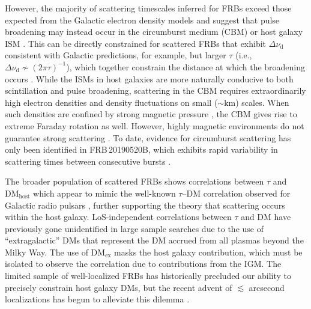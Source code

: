 \documentclass[twocolumn, linenumbers, tra]{aastex631}
\begin{document}
However, the majority of scattering timescales inferred for FRBs exceed those expected from the Galactic electron density models \citep[e.g., NE2001;][]{Cordes2002} and suggest that pulse broadening may instead occur in the circumburst medium (CBM) or host galaxy ISM \citep{Simha2020, Chittidi2021, Ocker2022a, Cordes2022}. This can be directly constrained for scattered FRBs that exhibit $\Delta \nu_{\mathrm{d}}$ consistent with Galactic predictions, for example, but larger $\tau$ (i.e., $\Delta \nu_{\mathrm{d}} \nsim (2\pi\tau)^{-1}$), which together constrain the distance at which the broadening occurs \citep[this is often referred to as ``two-screen'' scattering;][]{Ocker2022a, Sammons2023}. While the ISMs in host galaxies are more naturally conducive to both scintillation and pulse broadening, scattering in the CBM requires extraordinarily high electron densities and density fluctuations \citep[$n_{e} \gg 10^{-2}$ cm$^{-3}$, far exceeding a typical ISM;][]{Ocker2020} on small ($ \sim \mathrm{km}$) scales. When such densities are confined by strong magnetic pressure \citep[$B \gtrsim 50 \ \mu \mathrm{G}$, e.g., similar to magnetized filaments observed in the Crab nebula;][]{Bietenholz1991}, the CBM gives rise to extreme Faraday rotation as well. However, highly magnetic environments do not guarantee strong scattering \citep[e.g., FRB\,20121102A;][]{Michilli2018}. To date, evidence for circumburst scattering has only been identified in FRB\,20190520B, which exhibits rapid variability in scattering times between consecutive bursts \citep{Ocker2022c}. 

The broader population of scattered FRBs shows correlations between $\tau$ and $\mathrm{DM}_{\mathrm{host}}$ \citep{Cordes2022} which appear to mimic the well-known $\tau$--$\mathrm{DM}$ correlation observed for Galactic radio pulsars \citep{Cordes1991}, further supporting the theory that scattering occurs within the host galaxy. LoS-independent correlations between $\tau$ and DM have previously gone unidentified in large sample searches due to the use of ``extragalactic'' DMs \citep[DM$_\mathrm{ex}$;][]{Ravi2019, chime2019} that represent the DM accrued from all plasmas beyond the Milky Way. The use of DM$_{\mathrm{ex}}$ masks the host galaxy contribution, which must be isolated to observe the correlation due to contributions from the IGM. The limited sample of well-localized FRBs has historically precluded our ability to precisely constrain host galaxy DMs, but the recent advent of $\lesssim$ arcsecond localizations has begun to alleviate this dilemma \citep[see also][Verdi et al., in prep.]{Sherman2023}.
\end{document}
